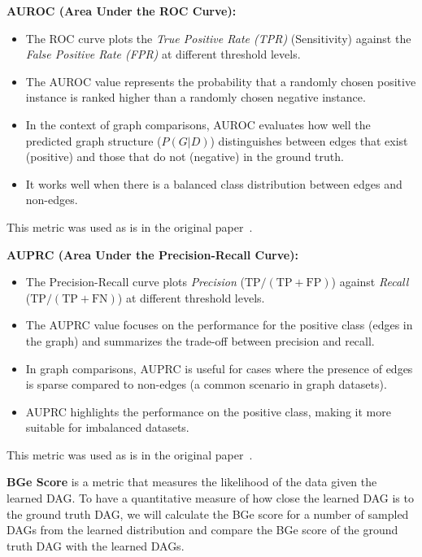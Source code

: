 \documentclass{lxaiproposal}
\begin{document}
    \vspace*{3mm}
    \textbf{AUROC (Area Under the ROC Curve):}
    \begin{itemize}
        \item The ROC curve plots the \textit{True Positive Rate (TPR)} (Sensitivity) against the \textit{False Positive Rate (FPR)} at different threshold levels.
        \item The AUROC value represents the probability that a randomly chosen positive instance is ranked higher than a randomly chosen negative instance.
        \item In the context of graph comparisons, AUROC evaluates how well the predicted graph structure ($P(G|D)$) distinguishes between edges that exist (positive) and those that do not (negative) in the ground truth.
        \item It works well when there is a balanced class distribution between edges and non-edges.
    \end{itemize}
    This metric was used as is in the original paper~\cite{deleu2022daggflownet}.


    \vspace*{3mm}
    \textbf{AUPRC (Area Under the Precision-Recall Curve):}
    \begin{itemize}
        \item The Precision-Recall curve plots \textit{Precision} ($\text{TP} / (\text{TP} + \text{FP})$) against \textit{Recall} ($\text{TP} / (\text{TP} + \text{FN})$) at different threshold levels.
        \item The AUPRC value focuses on the performance for the positive class (edges in the graph) and summarizes the trade-off between precision and recall.
        \item In graph comparisons, AUPRC is useful for cases where the presence of edges is sparse compared to non-edges (a common scenario in graph datasets).
        \item AUPRC highlights the performance on the positive class, making it more suitable for imbalanced datasets.
    \end{itemize}
    This metric was used as is in the original paper~\cite{deleu2022daggflownet}.


    \vspace*{3mm}
    \textbf{BGe Score} is a metric that measures the likelihood of the data given the learned DAG. To have a
    quantitative measure of how close the learned DAG is to the ground truth DAG, we will calculate the BGe score
    for a number of sampled DAGs from the learned distribution and compare the BGe score of the ground truth DAG with
    the learned DAGs.
\end{document}
